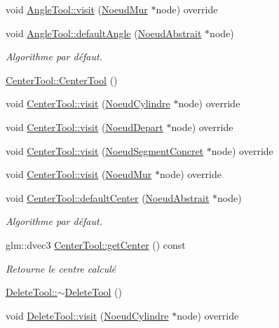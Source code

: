 \begin{DoxyCompactItemize}
\item 
void \hyperlink{group__inf2990_ga5bf124eb8955a829e87743cc6a737b49}{Angle\+Tool\+::visit} (\hyperlink{class_noeud_mur}{Noeud\+Mur} $\ast$node) override
\item 
void \hyperlink{group__inf2990_gac864ba35d8073ed9564a0a90d4df351d}{Angle\+Tool\+::default\+Angle} (\hyperlink{class_noeud_abstrait}{Noeud\+Abstrait} $\ast$node)
\begin{DoxyCompactList}\small\item\em Algorithme par défaut. \end{DoxyCompactList}\item 
\hyperlink{group__inf2990_ga3814d534b50e7dff7fbd7efef552685d}{Center\+Tool\+::\+Center\+Tool} ()
\item 
void \hyperlink{group__inf2990_ga9ceff880a444e12bc6b4dab4313c1809}{Center\+Tool\+::visit} (\hyperlink{class_noeud_cylindre}{Noeud\+Cylindre} $\ast$node) override
\item 
void \hyperlink{group__inf2990_ga8417547d629ccacfa218979e6ba6cdf5}{Center\+Tool\+::visit} (\hyperlink{class_noeud_depart}{Noeud\+Depart} $\ast$node) override
\item 
void \hyperlink{group__inf2990_gac441b1692c3b057050ced592ba372263}{Center\+Tool\+::visit} (\hyperlink{class_noeud_segment_concret}{Noeud\+Segment\+Concret} $\ast$node) override
\item 
void \hyperlink{group__inf2990_ga13d2bac067f4262be4fd60c302a07124}{Center\+Tool\+::visit} (\hyperlink{class_noeud_mur}{Noeud\+Mur} $\ast$node) override
\item 
void \hyperlink{group__inf2990_gab64cc9d2d491c0bd04a1efc4756740df}{Center\+Tool\+::default\+Center} (\hyperlink{class_noeud_abstrait}{Noeud\+Abstrait} $\ast$node)
\begin{DoxyCompactList}\small\item\em Algorithme par défaut. \end{DoxyCompactList}\item 
glm\+::dvec3 \hyperlink{group__inf2990_gaf086e5f530c5189f4b72563a4abfe35f}{Center\+Tool\+::get\+Center} () const 
\begin{DoxyCompactList}\small\item\em Retourne le centre calculé \end{DoxyCompactList}\item 
\hyperlink{group__inf2990_ga4a54f710ae3ca5e4eb8e16610d07c3bc}{Delete\+Tool\+::$\sim$\+Delete\+Tool} ()
\item 
void \hyperlink{group__inf2990_gaf91f134881ce52596486855f405e8f96}{Delete\+Tool\+::visit} (\hyperlink{class_noeud_cylindre}{Noeud\+Cylindre} $\ast$node) override

\end{DoxyCompactItemize}
